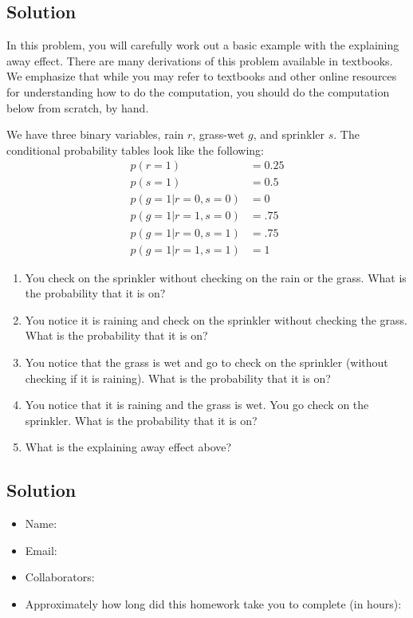 \documentclass[submit]{harvardml}
\begin{document}
\subsection*{Solution}

\newpage


\begin{problem}

  In this problem, you will carefully work out a basic example with
  the explaining away effect.  There are many derivations of this
  problem available in textbooks.  We emphasize that while you may
  refer to textbooks and other online resources for understanding how
  to do the computation, you should do the computation below from
  scratch, by hand.

  We have three binary variables, rain $r$, grass-wet $g$, and
  sprinkler $s$.  The conditional probability tables look like the
  following:
  \begin{eqnarray*}
    p(r = 1) &= 0.25 \\
    p(s = 1) &= 0.5 \\
    p(g = 1 | r = 0 , s = 0 ) &= 0 \\
    p(g = 1 | r = 1 , s = 0 ) &= .75 \\
    p(g = 1 | r = 0 , s = 1 ) &= .75 \\
    p(g = 1 | r = 1 , s = 1 ) &= 1
  \end{eqnarray*}

  \begin{enumerate}
    \item You check on the sprinkler without checking on the rain or
      the grass.  What is the probability that it is on?
    \item You notice it is raining and check on the sprinkler without
      checking the grass.  What is the probability that it is on?
    \item You notice that the grass is wet and go to check on the
      sprinkler (without checking if it is raining).  What is the
      probability that it is on?
    \item You notice that it is raining and the grass is wet.  You go
      check on the sprinkler.  What is the probability that it is on?
    \item What is the explaining away effect above?
    \end{enumerate}

\end{problem}

\subsection*{Solution}

\newpage

\begin{itemize}
    \item Name:
    \item Email:
    \item Collaborators:
    \item Approximately how long did this homework take you to complete (in hours):
\end{itemize}
\end{document}
